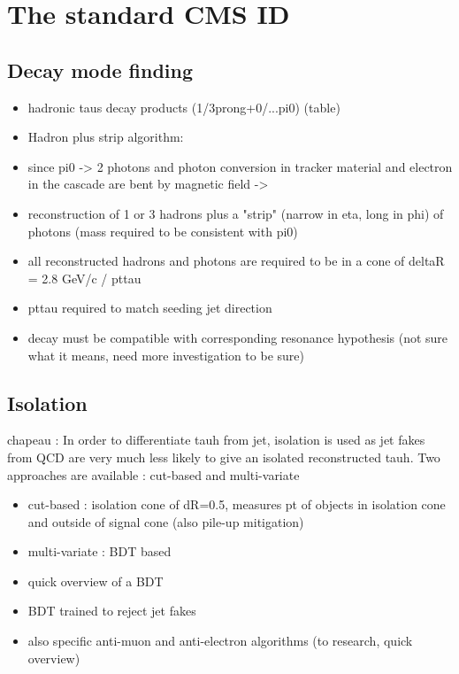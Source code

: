 \section{The standard CMS \tauh ID}

\subsection{Decay mode finding}

\begin{itemize}
    \item hadronic taus decay products (1/3prong+0/...pi0) (table)
    \item Hadron plus strip algorithm:
    \item since pi0 -> 2 photons and photon conversion in tracker material and electron in the cascade are bent by magnetic field ->
    \item reconstruction of 1 or 3 hadrons plus a "strip" (narrow in eta, long in phi) of photons (mass required to be consistent with pi0)
    \item all reconstructed hadrons and photons are required to be in a cone of deltaR = 2.8 GeV/c / pttau
    \item pttau required to match seeding jet direction
    \item decay must be compatible with corresponding resonance hypothesis (not sure what it means, need more investigation to be sure)
\end{itemize}

\subsection{Isolation}
chapeau : In order to differentiate tauh from jet, isolation is used as jet fakes from QCD are very much less likely to give an isolated reconstructed tauh. Two approaches are available : cut-based and multi-variate

\begin{itemize}
    \item cut-based : isolation cone of dR=0.5, measures pt of objects in isolation cone and outside of signal cone (also pile-up mitigation)
    \item multi-variate : BDT based
    \item quick overview of a BDT
    \item BDT trained to reject jet fakes
    \item also specific anti-muon and anti-electron algorithms (to research, quick overview)
\end{itemize}

